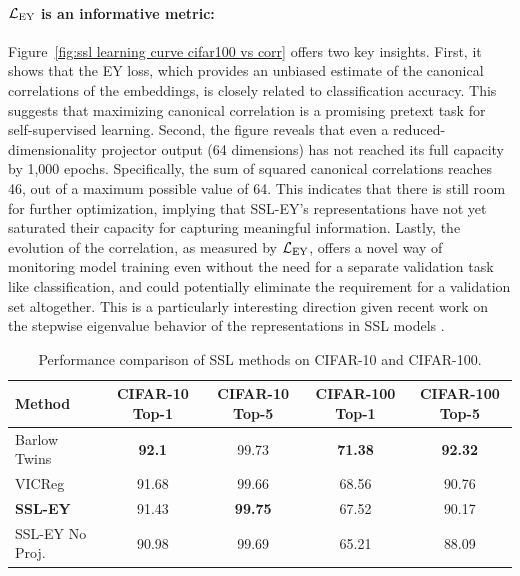 \paragraph{$\mathcal{L}_\text{EY}$ is an informative metric:} Figure~\ref{fig:ssl learning curve cifar100 vs corr} offers two key insights. First, it shows that the EY loss, which provides an unbiased estimate of the canonical correlations of the embeddings, is closely related to classification accuracy. This suggests that maximizing canonical correlation is a promising pretext task for self-supervised learning. Second, the figure reveals that even a reduced-dimensionality projector output (64 dimensions) has not reached its full capacity by 1,000 epochs. Specifically, the sum of squared canonical correlations reaches 46, out of a maximum possible value of 64. This indicates that there is still room for further optimization, implying that SSL-EY's representations have not yet saturated their capacity for capturing meaningful information. Lastly, the evolution of the correlation, as measured by $\mathcal{L}_\text{EY}$, offers a novel way of monitoring model training even without the need for a separate validation task like classification, and could potentially eliminate the requirement for a validation set altogether. This is a particularly interesting direction given recent work on the stepwise eigenvalue behavior of the representations in SSL models \cite{simon2023stepwise}.

\begin{table}[H]
    \centering
    \begin{tabular}{lcccc}
        \hline
        Method          & CIFAR-10 Top-1 & CIFAR-10 Top-5 & CIFAR-100 Top-1 & CIFAR-100 Top-5 \\
        \hline
        Barlow Twins    & \textbf{92.1}  & 99.73          & \textbf{71.38}  & \textbf{92.32}  \\
        VICReg          & 91.68          & 99.66          & 68.56           & 90.76           \\
        \textbf{SSL-EY} & 91.43          & \textbf{99.75} & 67.52           & 90.17           \\
        \hline
        SSL-EY No Proj. & 90.98          & 99.69          & 65.21           & 88.09           \\
        \hline
    \end{tabular}
    \caption{Performance comparison of SSL methods on CIFAR-10 and CIFAR-100.}
    \label{tab:selfsup}
\end{table}

